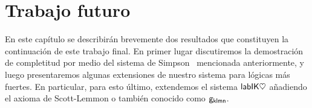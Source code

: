 \chapter{Trabajo futuro}
\label{cap:future}
 En este capítulo se describirán brevemente dos resultados que constituyen la continuación de este trabajo final. 
 En primer lugar discutiremos la demostración de completitud por medio del sistema de Simpson~\cite{simpson1994} mencionada anteriormente, y luego presentaremos algunas extensiones de nuestro sistema para lógicas más fuertes. En particular, para esto último, extendemos el sistema $\mathsf{labIK\heartsuit}$ añadiendo el axioma de Scott-Lemmon o también conocido como $\mathsf{g_{klmn}}$.


